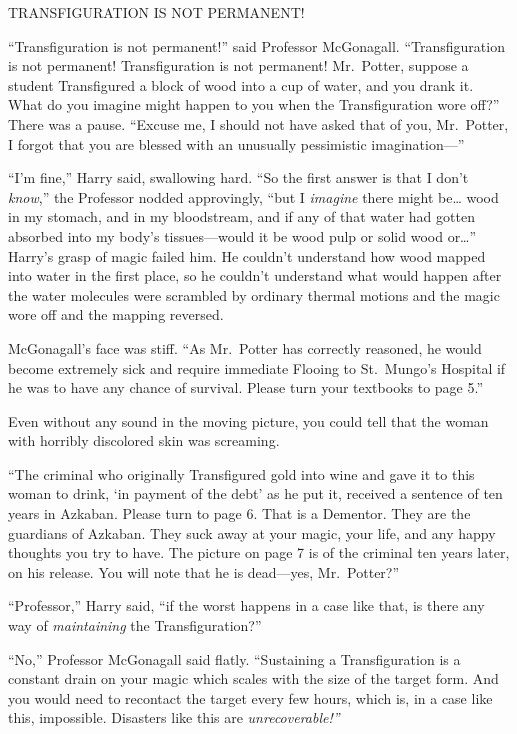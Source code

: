 TRANSFIGURATION IS NOT PERMANENT!

``Transfiguration is not permanent!'' said Professor McGonagall.
``Transfiguration is not permanent! Transfiguration is not permanent!
Mr.~Potter, suppose a student Transfigured a block of wood into a cup of
water, and you drank it. What do you imagine might happen to you when
the Transfiguration wore off?'' There was a pause. ``Excuse me, I should
not have asked that of you, Mr.~Potter, I forgot that you are blessed
with an unusually pessimistic imagination---''

``I'm fine,'' Harry said, swallowing hard. ``So the first answer is that
I don't \emph{know},'' the Professor nodded approvingly, ``but I
\emph{imagine} there might be\ldots{} wood in my stomach, and in my
bloodstream, and if any of that water had gotten absorbed into my body's
tissues---would it be wood pulp or solid wood or\ldots{}'' Harry's grasp
of magic failed him. He couldn't understand how wood mapped into water
in the first place, so he couldn't understand what would happen after
the water molecules were scrambled by ordinary thermal motions and the
magic wore off and the mapping reversed.

McGonagall's face was stiff. ``As Mr.~Potter has correctly reasoned, he
would become extremely sick and require immediate Flooing to St.~Mungo's
Hospital if he was to have any chance of survival. Please turn your
textbooks to page 5.''

Even without any sound in the moving picture, you could tell that the
woman with horribly discolored skin was screaming.

``The criminal who originally Transfigured gold into wine and gave it to
this woman to drink, `in payment of the debt' as he put it, received a
sentence of ten years in Azkaban. Please turn to page 6. That is a
Dementor. They are the guardians of Azkaban. They suck away at your
magic, your life, and any happy thoughts you try to have. The picture on
page 7 is of the criminal ten years later, on his release. You will note
that he is dead---yes, Mr.~Potter?''

``Professor,'' Harry said, ``if the worst happens in a case like that,
is there any way of \emph{maintaining} the Transfiguration?''

``No,'' Professor McGonagall said flatly. ``Sustaining a Transfiguration
is a constant drain on your magic which scales with the size of the
target form. And you would need to recontact the target every few hours,
which is, in a case like this, impossible. Disasters like this are
\emph{unrecoverable!''}

